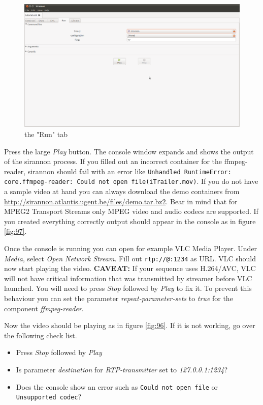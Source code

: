 \documentclass[12pt]{report}
\begin{document}
\begin{center}
\begin{figure}[!ht]
	\includegraphics[width=1.0\textwidth]{./images/ui98.png}
	\caption{the "Run" tab}
	\label{fig:98}
\end{figure}
\end{center}
\newpage

Press the large \textit{Play} button. The console window expands and shows the output of the sirannon process. If you filled out an incorrect container for the ffmpeg-reader, sirannon should fail with an error like \texttt{Unhandled RuntimeError: core.ffmpeg-reader: Could not open file(iTrailer.mov)}. If you do not have a sample video at hand you can always download the demo containers from \url{http://sirannon.atlantis.ugent.be/files/demo.tar.bz2}. Bear in mind that for MPEG2 Transport Streams only MPEG video and audio codecs are supported. If you created everything correctly output should appear in the console as in figure \ref{fig:97}.

Once the console is running you can open for example VLC Media Player. Under \textit{Media}, select \textit{Open Network Stream}. Fill out \texttt{rtp://@:1234} as URL. VLC should now start playing the video. \textbf{CAVEAT:} If your sequence uses H.264/AVC, VLC will not have critical information that was transmitted by streamer before VLC launched. You will need to press \textit{Stop} followed by \textit{Play} to fix it. To prevent this behaviour you can set the parameter \textit{repeat-parameter-sets} to \textit{true} for the component \textit{ffmpeg-reader}.

Now the video should be playing as in figure \ref{fig:96}. If it is not working, go over the following check list.
\begin{itemize}
\item Press \textit{Stop} followed by \textit{Play}
\item Is parameter \textit{destination} for \textit{RTP-transmitter} set to \textit{127.0.0.1:1234}?
\item Does the console show an error such as \texttt{Could not open file} or \texttt{Unsupported codec}?
\end{itemize}
\end{document}
